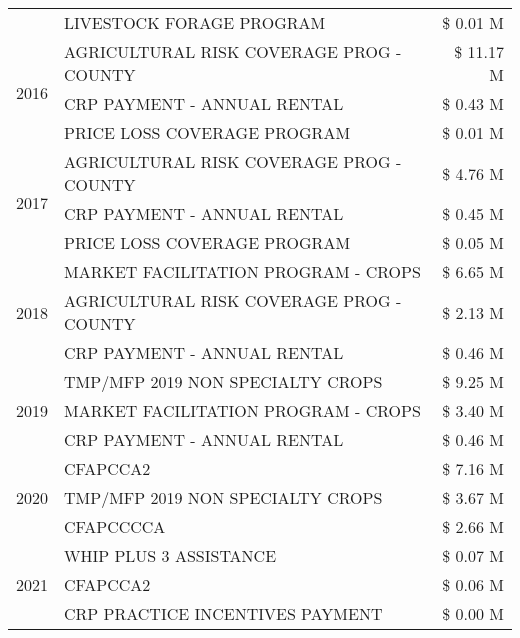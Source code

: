 \begin{tabular}{llr}
 & LIVESTOCK FORAGE PROGRAM & \$ 0.01 M \\
\cline{1-3}
\multirow[t]{3}{*}{2016} & AGRICULTURAL RISK COVERAGE PROG - COUNTY      & \$ 11.17 M \\
 & CRP PAYMENT - ANNUAL RENTAL                   & \$ 0.43 M \\
 & PRICE LOSS COVERAGE PROGRAM                   & \$ 0.01 M \\
\cline{1-3}
\multirow[t]{3}{*}{2017} & AGRICULTURAL RISK COVERAGE PROG - COUNTY & \$ 4.76 M \\
 & CRP PAYMENT - ANNUAL RENTAL & \$ 0.45 M \\
 & PRICE LOSS COVERAGE PROGRAM & \$ 0.05 M \\
\cline{1-3}
\multirow[t]{3}{*}{2018} & MARKET FACILITATION PROGRAM - CROPS & \$ 6.65 M \\
 & AGRICULTURAL RISK COVERAGE PROG - COUNTY & \$ 2.13 M \\
 & CRP PAYMENT - ANNUAL RENTAL & \$ 0.46 M \\
\cline{1-3}
\multirow[t]{3}{*}{2019} & TMP/MFP 2019 NON SPECIALTY CROPS & \$ 9.25 M \\
 & MARKET FACILITATION PROGRAM - CROPS & \$ 3.40 M \\
 & CRP PAYMENT - ANNUAL RENTAL & \$ 0.46 M \\
\cline{1-3}
\multirow[t]{3}{*}{2020} & CFAPCCA2 & \$ 7.16 M \\
 & TMP/MFP 2019 NON SPECIALTY CROPS & \$ 3.67 M \\
 & CFAPCCCCA & \$ 2.66 M \\
\cline{1-3}
\multirow[t]{3}{*}{2021} & WHIP PLUS 3 ASSISTANCE & \$ 0.07 M \\
 & CFAPCCA2 & \$ 0.06 M \\
 & CRP PRACTICE INCENTIVES PAYMENT & \$ 0.00 M \\
\cline{1-3}
\bottomrule
\end{tabular}

